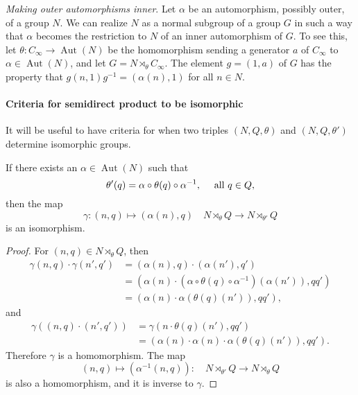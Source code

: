 \begin{example}
  \emph{Making outer automorphisms inner}.
  Let \( \alpha \) be an automorphism, possibly outer, of a group \( N \).
  We can realize \( N \) as a normal subgroup of a group \( G \) in such a way that \( \alpha \) becomes the restriction to \( N \) of an inner automorphism of \( G \).
  To see this, let \( \theta: C_\infty \to \operatorname{Aut}(N) \) be the homomorphism sending a generator \( a \) of \( C_\infty \) to \( \alpha \in \operatorname{Aut}(N) \), and let \( G = N \rtimes_\theta C_\infty \).
  The element \( g = (1, a) \) of \( G \) has the property that \( g(n, 1)g^{-1} = (\alpha(n), 1) \) for all \( n \in N \).
\end{example}

\paragraph{Criteria for semidirect product to be isomorphic}

It will be useful to have criteria for when two triples \( (N, Q, \theta) \) and \( (N, Q, \theta') \) determine isomorphic groups.

\begin{lemma}
  If there exists an \( \alpha \in \operatorname{Aut}(N) \) such that
  \[
    \theta'(q) = \alpha \circ \theta(q) \circ \alpha^{-1},\quad \textmd{ all } q \in Q,
  \]
  then the map
  \[
    \gamma: (n, q) \mapsto (\alpha(n), q)\quad N \rtimes_\theta Q \to N \rtimes_{\theta'} Q
  \]
  is an isomorphism.
\end{lemma}
\begin{proof}
  For \( (n, q) \in N \rtimes_\theta Q \), then
  \begin{align*}
    \gamma(n, q) \cdot \gamma(n', q') &= (\alpha(n), q) \cdot (\alpha(n'), q')\\
                                      &=(\alpha(n)\cdot(\alpha \circ \theta(q) \circ \alpha^{-1})(\alpha(n')), qq')\\
                                      &= (\alpha(n) \cdot \alpha(\theta(q)(n')), qq'),
  \end{align*}
  and
  \begin{align*}
    \gamma((n, q) \cdot (n', q')) &= \gamma(n \cdot \theta(q)(n'), qq')\\
                                  &= (\alpha(n)\cdot \alpha(n) \cdot\alpha(\theta(q)(n')), qq').
  \end{align*}
  Therefore \( \gamma \) is a homomorphism.
  The map
  \[
    (n, q) \mapsto (\alpha^{-1}(n, q)): \quad N \rtimes_{\theta'}Q \to N \rtimes_\theta Q
  \]
  is also a homomorphism, and it is inverse to \( \gamma \).
\end{proof}

